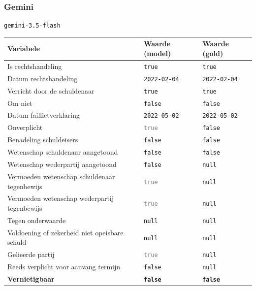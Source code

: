 \documentclass[
  dutch,
  a4paper,
]{article}
\begin{document}
\newpage


\subsubsection{Gemini}\label{gemini-3}

\texttt{gemini-3.5-flash}

\begin{center}
\small
\begin{tabular}{@{}p{7.4cm}p{2.6cm}p{2.6cm}@{}}
\toprule
Variabele & Waarde (model) & Waarde (gold) \\
\midrule
Is rechtshandeling & \texttt{true} & \texttt{true} \\
Datum rechtshandeling & \texttt{2022-02-04} & \texttt{2022-02-04} \\
Verricht door de schuldenaar & \texttt{true} & \texttt{true} \\
Om niet & \texttt{false} & \texttt{false} \\
Datum faillietverklaring & \texttt{2022-05-02} & \texttt{2022-05-02} \\
Onverplicht & \textcolor{gray}{\texttt{true}} & \texttt{false} \\
Benadeling schuldeisers & \texttt{false} & \texttt{false} \\
Wetenschap schuldenaar aangetoond & \texttt{false} & \texttt{false} \\
Wetenschap wederpartij aangetoond & \texttt{false} & \texttt{null} \\
Vermoeden wetenschap schuldenaar tegenbewijs & \textcolor{gray}{\texttt{true}} & \texttt{null} \\
Vermoeden wetenschap wederpartij tegenbewijs & \textcolor{gray}{\texttt{true}} & \texttt{null} \\
Tegen onderwaarde & \texttt{null} & \texttt{null} \\
Voldoening of zekerheid niet opeisbare schuld & \texttt{null} & \texttt{null} \\
Gelieerde partij & \textcolor{gray}{\texttt{true}} & \texttt{null} \\
Reeds verplicht voor aanvang termijn & \texttt{false} & \texttt{null} \\
\textbf{Vernietigbaar} & \textbf{\texttt{false}} & \textbf{\texttt{false}} \\
\bottomrule
\end{tabular}
\end{center}
\end{document}
